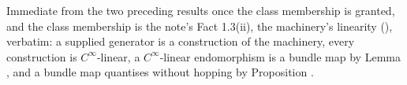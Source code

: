 Immediate from the two preceding results once the class membership is granted, and the class membership is the note's Fact 1.3(ii), the machinery's linearity (), verbatim: a supplied generator is a construction of the machinery, every construction is $C^\infty$-linear, a $C^\infty$-linear endomorphism is a bundle map by Lemma , and a bundle map quantises without hopping by Proposition .
